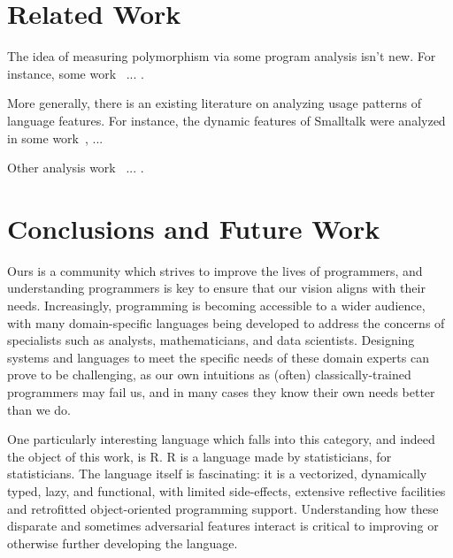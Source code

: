 \documentclass[acmsmall,10pt,review,anonymous]{acmart}\settopmatter{printfolios=true,printccs=false,printacmref=false}
\begin{document}
%
%
%
%
%

%
%
%
%
\section{Related Work}

The idea of measuring polymorphism via some program analysis isn't new.
For instance, some work~\cite{aakerblom2015measuring} ... .

More generally, there is an existing literature on analyzing usage patterns
of language features.  
For instance, the dynamic features of Smalltalk were analyzed in some work~\cite{callau2011howdevelopers}, ...

Other analysis work~\cite{milojkovic2017duck} ... .

%
%
%
%
%
\section{Conclusions and Future Work}

Ours is a community which strives to improve the lives of programmers, and understanding programmers is key to ensure that our vision aligns with their needs.
Increasingly, programming is becoming accessible to a wider audience, with many domain-specific languages being developed to address the concerns of specialists such as analysts, mathematicians, and data scientists.
Designing systems and languages to meet the specific needs of these domain experts can prove to be challenging, as our own intuitions as (often) classically-trained programmers may fail us, and in many cases they know their own needs better than we do.

One particularly interesting language which falls into this category, and indeed the object of this work, is R.
R is a language made by statisticians, for statisticians. 
The language itself is fascinating: it is a vectorized, dynamically
typed, lazy, and functional, with limited side-effects, extensive
reflective facilities and retrofitted object-oriented programming support.
Understanding how these disparate and sometimes adversarial features interact is critical to improving or otherwise further developing the language.
\end{document}
